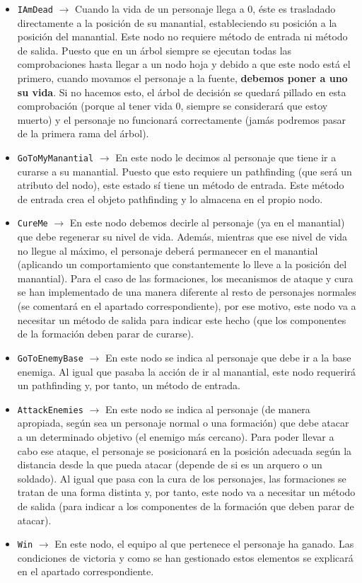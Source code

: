\begin{itemize}
	\item \texttt{IAmDead} $\rightarrow$ Cuando la vida de un personaje llega a 0, éste es trasladado directamente a la posición de su manantial, estableciendo su posición a la posición del manantial. Este nodo no requiere método de entrada ni método de salida. Puesto que en un árbol siempre se ejecutan todas las comprobaciones hasta llegar a un nodo hoja y debido a que este nodo está el primero, cuando movamos el personaje a la fuente, \textbf{debemos poner a uno su vida}. Si no hacemos esto, el árbol de decisión se quedará pillado en esta comprobación (porque al tener vida 0, siempre se considerará que estoy muerto) y el personaje no funcionará correctamente (jamás podremos pasar de la primera rama del árbol).
	\item \texttt{GoToMyManantial} $\rightarrow$ En este nodo le decimos al personaje que tiene ir a curarse a su manantial. Puesto que esto requiere un pathfinding (que será un atributo del nodo), este estado sí tiene un método de entrada. Este método de entrada crea el objeto pathfinding y lo almacena en el propio nodo.
	\item \texttt{CureMe} $\rightarrow$ En este nodo debemos decirle al personaje (ya en el manantial) que debe regenerar su nivel de vida. Además, mientras que ese nivel de vida no llegue al máximo, el personaje deberá permanecer en el manantial (aplicando un comportamiento que constantemente lo lleve a la posición del manantial). Para el caso de las formaciones, los mecanismos de ataque y cura se han implementado de una manera diferente al resto de personajes normales (se comentará en el apartado correspondiente), por ese motivo, este nodo va a necesitar un método de salida para indicar este hecho (que los componentes de la formación deben parar de curarse).
	\item \texttt{GoToEnemyBase} $\rightarrow$ En este nodo se indica al personaje que debe ir a la base enemiga. Al igual que pasaba la acción de ir al manantial, este nodo requerirá un pathfinding y, por tanto, un método de entrada.
	\item \texttt{AttackEnemies} $\rightarrow$ En este nodo se indica al personaje (de manera apropiada, según sea un personaje normal o una formación) que debe atacar a un determinado objetivo (el enemigo más cercano). Para poder llevar a cabo ese ataque, el personaje se posicionará en la posición adecuada según la distancia desde la que pueda atacar (depende de si es un arquero o un soldado). Al igual que pasa con la cura de los personajes, las formaciones se tratan de una forma distinta y, por tanto, este nodo va a necesitar un método de salida (para indicar a los componentes de la formación que deben parar de atacar).
	\item \texttt{Win} $\rightarrow$ En este nodo, el equipo al que pertenece el personaje ha ganado. Las condiciones de victoria y como se han gestionado estos elementos se explicará en el apartado correspondiente.
\end{itemize}

